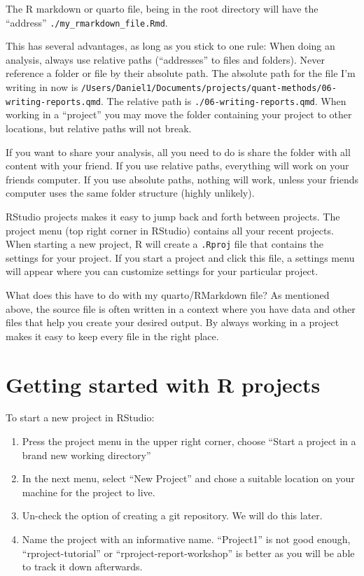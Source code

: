 \documentclass[
  11pt,
  letterpaper,
]{scrbook}
\begin{document}
The R markdown or quarto file, being in the root directory will have the
``address'' \texttt{./my\_rmarkdown\_file.Rmd}.

This has several advantages, as long as you stick to one rule: When
doing an analysis, always use relative paths (``addresses'' to files and
folders). Never reference a folder or file by their absolute path. The
absolute path for the file I'm writing in now is
\texttt{/Users/Daniel1/Documents/projects/quant-methods/06-writing-reports.qmd}.
The relative path is \texttt{./06-writing-reports.qmd}. When working in
a ``project'' you may move the folder containing your project to other
locations, but relative paths will not break.

If you want to share your analysis, all you need to do is share the
folder with all content with your friend. If you use relative paths,
everything will work on your friends computer. If you use absolute
paths, nothing will work, unless your friends computer uses the same
folder structure (highly unlikely).

RStudio projects makes it easy to jump back and forth between projects.
The project menu (top right corner in RStudio) contains all your recent
projects. When starting a new project, R will create a \texttt{.Rproj}
file that contains the settings for your project. If you start a project
and click this file, a settings menu will appear where you can customize
settings for your particular project.

What does this have to do with my quarto/RMarkdown file? As mentioned
above, the source file is often written in a context where you have data
and other files that help you create your desired output. By always
working in a project makes it easy to keep every file in the right
place.

\hypertarget{getting-started-with-r-projects}{%
\section{Getting started with R
projects}\label{getting-started-with-r-projects}}

To start a new project in RStudio:

\begin{enumerate}
\def\labelenumi{\arabic{enumi}.}
\item
  Press the project menu in the upper right corner, choose ``Start a
  project in a brand new working directory''
\item
  In the next menu, select ``New Project'' and chose a suitable location
  on your machine for the project to live.
\item
  Un-check the option of creating a git repository. We will do this
  later.
\item
  Name the project with an informative name. ``Project1'' is not good
  enough, ``rproject-tutorial'' or ``rproject-report-workshop'' is
  better as you will be able to track it down afterwards.
\end{enumerate}
\end{document}
